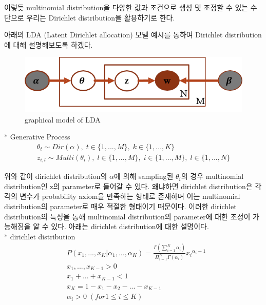 \documentclass[a4paper]{oblivoir}
\begin{document}
이렇듯 multinomial distribution을 다양한 값과 조건으로 생성 및 조정할 수 있는 수단으로 우리는 Dirichlet distribution을 활용하기로 한다. 

아래의 LDA (Latent Dirichlet allocation) 모델 예시를 통하여 Dirichlet distribution에 대해 설명해보도록 하겠다.

\begin{figure}[ht] \centering 
\includegraphics[scale=0.5]{fig13_2.png} 
\caption{graphical model of LDA}
\label{fig:13-2}
\end{figure}

* Generative Process
\begin{equation}
\begin{split}
\theta_{t} \sim Dir(\alpha), \; t \in \{1,...,M\}, \; k \in \{1,...,K\} \\
z_{i,l} \sim Multi(\theta_{i}), \; l \in \{1,...,M\}, \; i \in \{1,...,M\}, \; l \in \{1,...,N\} \nonumber
\end{split}
\end{equation}

위와 같이 dirichlet distribution의 $\alpha$에 의해 sampling된 $\theta_{i}$의 경우 multinomial distribution인 z의 parameter로 들어갈 수 있다. 왜냐하면 dirichlet distribution은 각각의 변수가 probability axiom을 만족하는 형태로 존재하며 이는 multinomial distribution의 parameter로 매우 적절한 형태이기 때문이다. 이러한 dirichlet distribution의 특성을 통해 multinomial distribution의 parameter에 대한 조정이 가능해짐을 알 수 있다. 아래는 dirichlet distribution에 대한 설명이다.\\


* dirichlet distribution
\begin{eqnarray*}
&P(x_{1},...,x_{K}|\alpha_{1},...,\alpha_{K}) = \frac{\Gamma(\sum^{K}_{i=1}\alpha_{i})}{\Pi^{N}_{i=1}\Gamma(\alpha_{i})}{x_{i}}^{\alpha_{i}-1}\nonumber\\
&x_{1},...,x_{K-1} > 0 \\
&x_{1}+...+x_{K-1} < 1 \\
&x_{K}=1-x_{1}-x_{2}-...-x_{K-1}\\
&\alpha_{i} > 0 \; (for 1 \leq i \leq K)
\end{eqnarray*}
\end{document}
